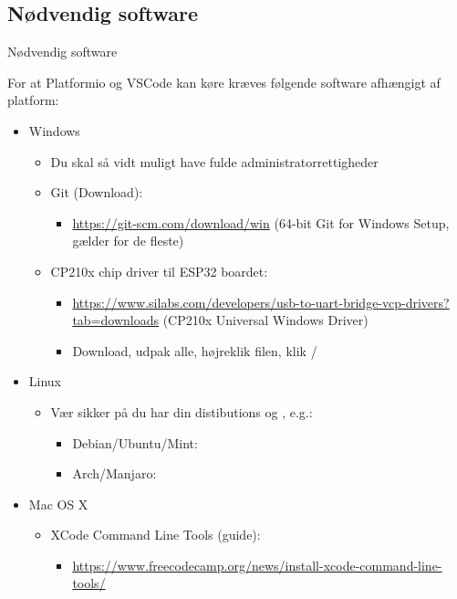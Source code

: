 \documentclass[aspectratio=169]{beamer}
\begin{document}
\subsection{Nødvendig software}
\begin{frame}{Nødvendig software}
	\begin{textBox}
	For at Platformio og VSCode kan køre kræves følgende software afhængigt af platform:
		\begin{itemize}
			\item Windows
			\begin{itemize}
				\item Du skal så vidt muligt have fulde administratorrettigheder
				\item Git (Download):
				\begin{itemize}
					\item \small\url{https://git-scm.com/download/win} (64-bit Git for Windows Setup, gælder for de fleste)
				\end{itemize}
				\item CP210x chip driver til ESP32 boardet:
				\begin{itemize}
					\item \small\url{https://www.silabs.com/developers/usb-to-uart-bridge-vcp-drivers?tab=downloads} (CP210x Universal Windows Driver)
					\item Download, udpak alle, højreklik  filen, klik /
				\end{itemize}
			\end{itemize}
			\item Linux
			\begin{itemize}
				\item Vær sikker på du har din distibutions  og , e.g.:
				\begin{itemize}
					\item Debian/Ubuntu/Mint: \small{}
					\item Arch/Manjaro: \small{}
				\end{itemize}
			\end{itemize}
			\item Mac OS X
			\begin{itemize}
				\item XCode Command Line Tools (guide):
				\begin{itemize}
					\item \small\url{https://www.freecodecamp.org/news/install-xcode-command-line-tools/}
				\end{itemize}
			\end{itemize}
		\end{itemize}
	\end{textBox}
\end{frame}
\end{document}
